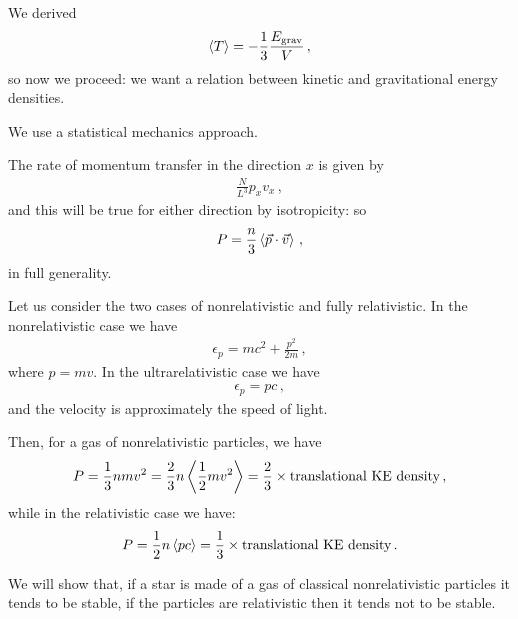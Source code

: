 \documentclass[main.tex]{subfiles}
\begin{document}

We derived 
%
\begin{align}
  \expval{T} = -\frac{1}{3} \frac{E _{\text{grav}}}{V}
\,,
\end{align}
%
so now we proceed: we want a relation between kinetic and gravitational energy densities. 

We use a statistical mechanics approach. 

The rate of momentum transfer in the direction \(x\) is given by 
%
\begin{align}
  \frac{N}{L^3} p_x v_x
\,,
\end{align}
%
and this will be true for either direction by isotropicity: so 
%
\begin{align}
  P = \frac{n}{3} \expval{\vec{p} \cdot \vec{v}}
\,,
\end{align}
%
in full generality. 

Let us consider the two cases of nonrelativistic and fully relativistic. In the nonrelativistic case we have 
%
\begin{align}
  \epsilon_{p} = mc^2 + \frac{p^2}{2m}
\,,
\end{align}
%
where \(p = mv\). In the ultrarelativistic case we have 
%
\begin{align}
  \epsilon_{p} = pc
\,,
\end{align}
%
and the velocity is approximately the speed of light. 

Then, for a gas of nonrelativistic particles, we have 
%
\begin{align}
  P = \frac{1}{3} n mv^2 = \frac{2}{3} n \expval{\frac{1}{2}m v^2} = \frac{2}{3} \times \text{translational KE density}
\,,
\end{align}
%
while in the relativistic case we have: 
%
\begin{align}
  P = \frac{1}{2} n \expval{pc} = \frac{1}{3} \times \text{translational KE density}
\,.
\end{align}

We will show that, if a star is made of a gas of classical nonrelativistic particles it tends to be stable, if the particles are relativistic then it tends not to be stable.
\end{document}
